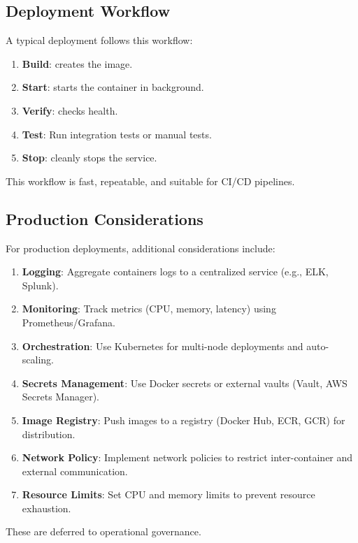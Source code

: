 \subsection{Deployment Workflow}

A typical deployment follows this workflow:

\begin{enumerate}
  \item \textbf{Build}:  creates the image.
  
  \item \textbf{Start}:  starts the container in background.
  
  \item \textbf{Verify}:  checks health.
  
  \item \textbf{Test}: Run integration tests or manual tests.
  
  \item \textbf{Stop}:  cleanly stops the service.
\end{enumerate}

This workflow is fast, repeatable, and suitable for CI/CD pipelines.

\subsection{Production Considerations}

For production deployments, additional considerations include:

\begin{enumerate}
  \item \textbf{Logging}: Aggregate containers logs to a centralized service (e.g., ELK, Splunk).
  
  \item \textbf{Monitoring}: Track metrics (CPU, memory, latency) using Prometheus/Grafana.
  
  \item \textbf{Orchestration}: Use Kubernetes for multi-node deployments and auto-scaling.
  
  \item \textbf{Secrets Management}: Use Docker secrets or external vaults (Vault, AWS Secrets Manager).
  
  \item \textbf{Image Registry}: Push images to a registry (Docker Hub, ECR, GCR) for distribution.
  
  \item \textbf{Network Policy}: Implement network policies to restrict inter-container and external communication.
  
  \item \textbf{Resource Limits}: Set CPU and memory limits to prevent resource exhaustion.
\end{enumerate}

These are deferred to operational governance.
